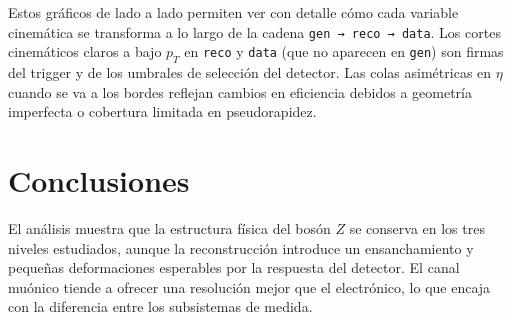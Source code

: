 \documentclass[11pt]{article}
\begin{document}
    \begin{center}
    \end{center}
    { \hspace*{\fill} \\}
    
    \begin{center}
    \end{center}
    { \hspace*{\fill} \\}
    
    \begin{center}
    \end{center}
    { \hspace*{\fill} \\}
    
    \begin{center}
    \end{center}
    { \hspace*{\fill} \\}
    
    \begin{center}
    \end{center}
    { \hspace*{\fill} \\}
    
    Estos gráficos de lado a lado permiten ver con detalle cómo cada
variable cinemática se transforma a lo largo de la cadena
\texttt{gen\ →\ reco\ →\ data}. Los cortes cinemáticos claros a bajo
\(p_T\) en \texttt{reco} y \texttt{data} (que no aparecen en
\texttt{gen}) son firmas del trigger y de los umbrales de selección del
detector. Las colas asimétricas en \(\eta\) cuando se va a los bordes
reflejan cambios en eficiencia debidos a geometría imperfecta o
cobertura limitada en pseudorapidez.

    \hypertarget{conclusiones}{%
\section{Conclusiones}\label{conclusiones}}

    El análisis muestra que la estructura física del bosón \(Z\) se conserva
en los tres niveles estudiados, aunque la reconstrucción introduce un
ensanchamiento y pequeñas deformaciones esperables por la respuesta del
detector. El canal muónico tiende a ofrecer una resolución mejor que el
electrónico, lo que encaja con la diferencia entre los subsistemas de
medida.
\end{document}
